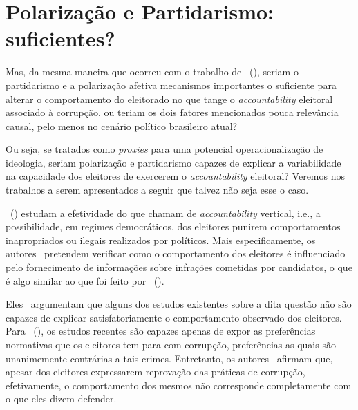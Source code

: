 \documentclass[
	12pt,				%
	openright,			%
	twoside,			%
	a4paper,			%
	openany,
	english,			%
	brazil				%
	]{abntex2}
\begin{document}
\section{Polarização e Partidarismo: suficientes?}

Mas, da mesma maneira que ocorreu com o trabalho de ~(\citeyear{ferraz2008exposing}), seriam o partidarismo e a polarização afetiva mecanismos importantes o suficiente para alterar o comportamento do eleitorado no que tange o \textit{accountability} eleitoral associado à corrupção, ou teriam os dois fatores mencionados pouca relevância causal, pelo menos no cenário político brasileiro atual?

Ou seja, se tratados como \textit{proxies} para uma potencial operacionalização de ideologia, seriam polarização e partidarismo capazes de explicar a variabilidade na capacidade dos eleitores de exercerem o \textit{accountability} eleitoral? Veremos nos trabalhos a serem apresentados a seguir que talvez não seja esse o caso.




~(\citeyear{Boas2019Apr}) estudam a efetividade do que chamam de \textit{accountability} vertical, i.e., a possibilidade, em regimes democráticos, dos eleitores punirem comportamentos inapropriados ou ilegais realizados por políticos. Mais especificamente, os autores~\cite{Boas2019Apr} pretendem verificar como o comportamento dos eleitores é influenciado pelo fornecimento de informações sobre infrações cometidas por candidatos, o que é algo similar ao que foi feito por ~(\citeyear{ferraz2008exposing}). 

Eles~\cite{Boas2019Apr} argumentam que alguns dos estudos existentes sobre a dita questão não são capazes de explicar satisfatoriamente o comportamento observado dos eleitores. Para ~(\citeyear{Boas2019Apr}), os estudos recentes são capazes apenas de expor as preferências normativas que os eleitores tem para com corrupção, preferências as quais são unanimemente contrárias a tais crimes. Entretanto, os autores~\cite{Boas2019Apr} afirmam que, apesar dos eleitores expressarem reprovação das práticas de corrupção, efetivamente, o comportamento dos mesmos não corresponde completamente com o que eles dizem defender.
\end{document}
